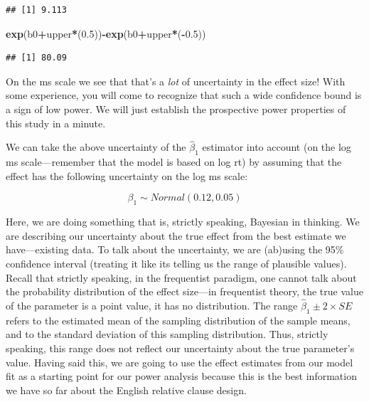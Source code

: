 \documentclass[12pt,]{krantz}
\newenvironment{Shaded}{\begin{snugshade}}{\end{snugshade}}
\newcommand{\FloatTok}[1]{\textcolor[rgb]{0.00,0.00,0.81}{#1}}
\newcommand{\KeywordTok}[1]{\textcolor[rgb]{0.13,0.29,0.53}{\textbf{#1}}}
\newcommand{\NormalTok}[1]{#1}
\newcommand{\OperatorTok}[1]{\textcolor[rgb]{0.81,0.36,0.00}{\textbf{#1}}}
\begin{document}
\begin{verbatim}
## [1] 9.113
\end{verbatim}

\begin{Shaded}
\begin{Highlighting}[]
\KeywordTok{exp}\NormalTok{(b0}\OperatorTok{+}\NormalTok{upper}\OperatorTok{*}\NormalTok{(}\FloatTok{0.5}\NormalTok{))}\OperatorTok{-}\KeywordTok{exp}\NormalTok{(b0}\OperatorTok{+}\NormalTok{upper}\OperatorTok{*}\NormalTok{(}\OperatorTok{-}\FloatTok{0.5}\NormalTok{))}
\end{Highlighting}
\end{Shaded}

\begin{verbatim}
## [1] 80.09
\end{verbatim}

On the ms scale we see that that's a \emph{lot} of uncertainty in the effect size! With some experience, you will come to recognize that such a wide confidence bound is a sign of low power. We will just establish the prospective power properties of this study in a minute.

We can take the above uncertainty of the \(\hat\beta_1\) estimator into account (on the log ms scale---remember that the model is based on log rt) by assuming that the effect has the following uncertainty on the log ms scale:

\begin{equation}
\beta_1 \sim Normal(0.12,0.05)
\end{equation}

Here, we are doing something that is, strictly speaking, Bayesian in thinking. We are describing our uncertainty about the true effect from the best estimate we have---existing data. To talk about the uncertainty, we are (ab)using the 95\% confidence interval (treating it like its telling us the range of plausible values). Recall that strictly speaking, in the frequentist paradigm, one cannot talk about the probability distribution of the effect size---in frequentist theory, the true value of the parameter is a point value, it has no distribution. The range \(\hat\beta_1 \pm 2\times SE\) refers to the estimated mean of the sampling distribution of the sample means, and to the standard deviation of this sampling distribution. Thus, strictly speaking, this range does not reflect our uncertainty about the true parameter's value. Having said this, we are going to use the effect estimates from our model fit as a starting point for our power analysis because this is the best information we have so far about the English relative clause design.
\end{document}
